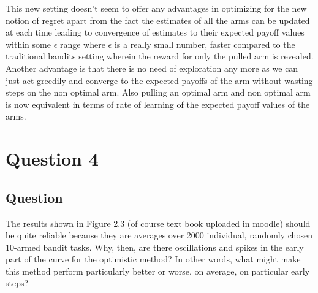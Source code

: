 \documentclass[english]{article}
\begin{document}
\newline
\newline
This new setting doesn't seem to offer any advantages in optimizing for the new notion of regret apart from the fact the estimates of all the arms can be updated at each time leading to convergence of estimates to their expected payoff values within some $\epsilon$ range where $\epsilon$ is a really small number, faster compared to the traditional bandits setting wherein the reward for only the pulled arm is revealed. Another advantage is that there is no need of exploration any more as we can just act greedily and converge to the expected payoffs of the arm without wasting steps on the non optimal arm. Also pulling an optimal arm and non optimal arm is now equivalent in terms of rate of learning of the expected payoff values of the arms. 


\section{Question 4}
\subsection{Question}
The results shown in Figure 2.3 (of course text book uploaded in moodle) should be quite reliable because they are averages over 2000 individual, randomly chosen 10-armed bandit tasks. Why, then, are there oscillations and spikes in the early part of the curve for the optimistic method? In other words, what might make this method perform particularly better or worse, on average, on particular early steps?
\end{document}
